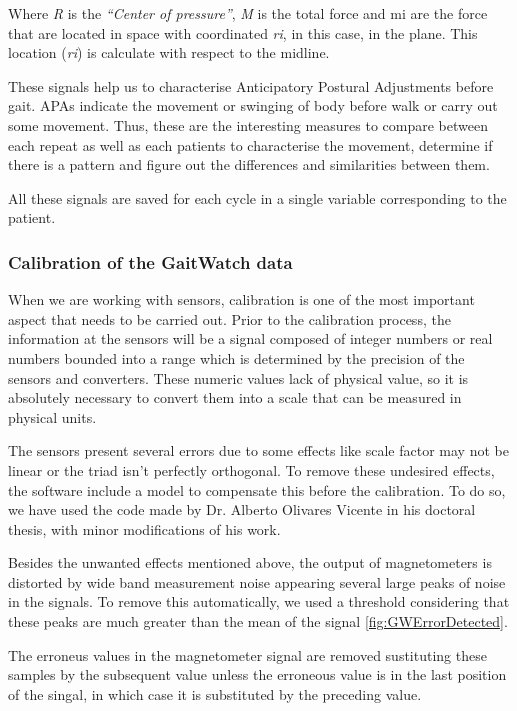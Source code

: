 Where \textit{R} is the \textit{“Center of pressure”\textit{}}, \textit{M\textit{}} is the total force and mi are the force that are located in space with coordinated \textit{ri\textit{}}, in this case, in the plane. This location (\textit{ri}) is calculate with respect to the midline.

These signals help us to characterise Anticipatory Postural Adjustments  before gait.  APAs indicate the movement or swinging of body before walk or carry out some movement. Thus, these are the interesting  measures to compare between each repeat as well as each patients to characterise the movement, determine if there is a pattern and figure out the differences and similarities between them.

All these signals are saved for each cycle in a single variable corresponding to the patient.


\subsubsection{Calibration of the GaitWatch data}
When we are working with sensors, calibration is one of the most important aspect that needs to be carried out. Prior to the calibration process,
the information at the sensors  will be a signal composed of integer
numbers  or real numbers bounded into a range which is determined by the precision of the sensors and converters. These numeric values lack of physical value, so it is absolutely necessary to convert them into a scale that can be measured in physical units.

The sensors present several errors due to some effects like scale factor may not be linear or the triad isn’t perfectly orthogonal. To remove these undesired effects, the software include a model to compensate this before the calibration. 
To do so, we have used the code made by Dr. Alberto Olivares Vicente in his doctoral thesis\cite{A.Olivares2013}, with minor modifications of his work.

Besides the unwanted effects mentioned above, the output of magnetometers is distorted by wide band measurement noise appearing several large peaks of noise in the signals. To remove this automatically, we used a threshold considering that these peaks are much greater than the mean of the signal \ref{fig:GWErrorDetected}.

The erroneus values in the magnetometer signal are removed sustituting these samples by the subsequent value unless the erroneous value is in the last position of the singal, in which case it is substituted by the preceding value.

